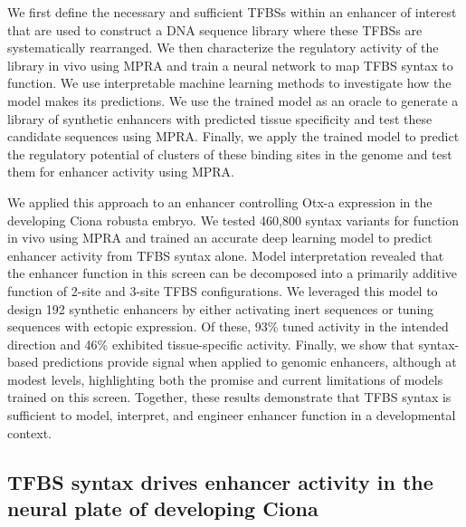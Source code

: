 We first define the necessary and sufficient TFBSs within an enhancer of interest that are used to construct a DNA sequence library where these TFBSs are systematically rearranged. 
We then characterize the regulatory activity of the library in vivo using MPRA and train a neural network to map TFBS syntax to function. 
We use interpretable machine learning methods to investigate how the model makes its predictions.
We use the trained model as an oracle to generate a library of synthetic enhancers with predicted tissue specificity and test these candidate sequences using MPRA.
Finally, we apply the trained model to predict the regulatory potential of clusters of these binding sites in the genome and test them for enhancer activity using MPRA.

We applied this approach to an enhancer controlling Otx-a expression in the developing Ciona robusta embryo. We tested 460,800 syntax variants for function in vivo using MPRA and trained an accurate deep learning model to predict enhancer activity from TFBS syntax alone. Model interpretation revealed that the enhancer function in this screen can be decomposed into a primarily additive function of 2-site and 3-site TFBS configurations. We leveraged this model to design 192 synthetic enhancers by either activating inert sequences or tuning sequences with ectopic expression. Of these, 93\% tuned activity in the intended direction and 46\% exhibited tissue-specific activity. Finally, we show that syntax-based predictions provide signal when applied to genomic enhancers, although at modest levels, highlighting both the promise and current limitations of models trained on this screen. Together, these results demonstrate that TFBS syntax is sufficient to model, interpret, and engineer enhancer function in a developmental context.

\subsection{TFBS syntax drives enhancer activity in the neural plate of developing Ciona}

